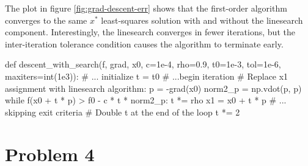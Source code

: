 \documentclass{homework}
\begin{document}
The plot in figure \ref{fig:grad-descent-err} shows that the first-order algorithm converges to the same $x^*$ least-squares
solution with and without the linesearch component. Interestingly, the linesearch converges in fewer iterations, but the inter-iteration
tolerance condition causes the algorithm to terminate early.


\begin{center}
    \begin{python}

def descent_with_search(f, grad, x0, c=1e-4, rho=0.9, t0=1e-3, tol=1e-6, maxiters=int(1e3)):
    # ... initialize
    t = t0
    # ...begin iteration
        # Replace x1 assignment with linesearch algorithm:
        p = -grad(x0)
        norm2_p = np.vdot(p, p)
        while f(x0 + t * p) > f0 - c * t * norm2_p:
            t *= rho
        x1 = x0 + t * p
        # ... skipping exit criteria
        # Double t at the end of the loop
        t *= 2
    \end{python}
    \label{fig:linesearch-code}
\end{center}

\section{Problem 4}
\end{document}
